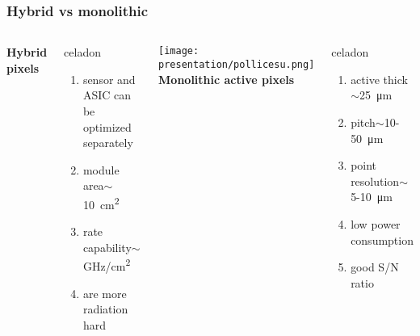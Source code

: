     \begin{frame}
        \frametitle{Hybrid vs monolithic}
        \begin{columns}
                \centering\textbf{Hybrid pixels}
                \begin{beamercolorbox}[ rounded=true, center]{celadon}
                    \begin{enumerate}
                        \item sensor and ASIC can be optimized separately
                        \item module area$\sim$\SI{10}{cm\squared}
                        \item rate capability$\sim$\si{GHz/cm\squared}
                        \item are more radiation hard 
                    \end{enumerate} 
                \end{beamercolorbox}
                \texttt{[image: presentation/pollicesu.png]}
                \centering\textbf{Monolithic active pixels}
                \begin{beamercolorbox}[ rounded=true, center]{celadon}
                    \begin{enumerate}
                        \item active thick$\sim$\SI{25}{\um}
                        \item pitch$\sim$10-\SI{50}{\um}
                        \item point resolution$\sim$5-\SI{10}{\um}
                        \item low power consumption
                        \item good S/N ratio
                    \end{enumerate}    
                \end{beamercolorbox}
        \end{columns}
       

\end{frame}
